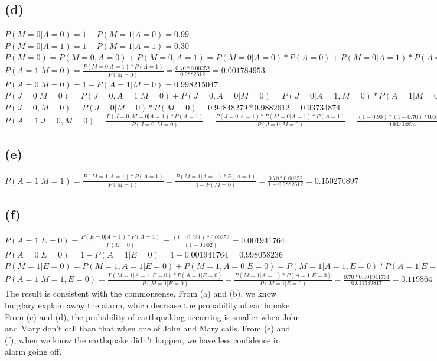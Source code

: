 \documentclass [11pt, a4paper, oneside] {article}
\begin{document}
\subsection *{(d)}
$P(M=0|A=0) = 1 - P(M=1|A=0) = 0.99$\\
$P(M=0|A=1) = 1 - P(M=1|A=1) = 0.30$\\
$P(M=0) = P(M=0, A=0) + P(M=0, A=1) = P(M=0|A=0)*P(A=0) + P(M=0|A=1)*P(A=1) = 0.99*0.99748 + 0.30*0.00252 = 0.9882612$\\
$P(A=1|M=0) = \frac{P(M=0|A=1)*P(A=1)}{P(M=0)} = \frac{0.70*0.00252}{0.9882612} = 0.001784953$\\
$P(A=0|M=0) = 1 - P(A=1|M=0) = 0.998215047$\\
$P(J=0|M=0) = P(J=0, A=1|M=0) + P(J=0, A=0|M=0) = P(J=0|A=1, M=0)*P(A=1|M=0) + P(J=0|A=0, M=0)*P(A=0|M=0) = P(J=0|A=1)*P(A=1|M=0) + P(J=0|A=0)*P(A=0|M=0)=
(1-0.90)*0.001784953 + (1-0.05)*0.998215047 = 0.94848279$\\
$P(J=0, M=0) = P(J=0|M=0) * P(M=0) = 0.94848279 * 0.9882612 = 0.93734874$\\
$P(A=1|J=0, M=0) = \frac{P(J=0, M=0|A=1)*P(A=1)}{P(J=0, M=0)} = \frac{P(J=0|A=1)*P(M=0|A=1)*P(A=1)}{P(J=0, M=0)} = \frac{(1-0.90)*(1-0.70)*0.00252}{0.93734874} = 0.000080653$\\
\subsection *{(e)}
$P(A=1|M=1) = \frac{P(M=1|A=1)*P(A=1)}{P(M=1)} = \frac{P(M=1|A=1)*P(A=1)}{1 - P(M=0)} = \frac{0.70*0.00252}{1-0.9882612} = 0.150270897$\\
\subsection *{(f)}
$P(A=1|E=0) = \frac{P(E=0|A=1)*P(A=1)}{P(E=0)} = \frac{(1-0.231)*0.00252}{(1-0.002)} = 0.001941764$\\
$P(A=0|E=0) = 1 - P(A=1|E=0) = 1 - 0.001941764 = 0.998058236$\\
$P(M=1|E=0) = P(M=1, A=1|E=0) + P(M=1, A=0|E=0) = P(M=1|A=1, E=0)*P(A=1|E=0) + P(M=1|A=0, E=0)*P(A=0|E=0) = P(M=1|A=1)*P(A=1|E=0) + P(M=1|A=0)*P(A=0|E=0) = 
0.70*0.001941764 + 0.01*0.998058236 = 0.011339817$\\
$P(A=1|M=1, E=0) = \frac{P(M=1|A=1, E=0)*P(A=1|E=0)}{P(M=1|E=0)} = \frac{P(M=1|A=1)*P(A=1|E=0)}{P(M=1|E=0)} = \frac{0.70*0.001941764}{0.011339817} = 0.119864$\\

The result is consistent with the commonsense. From (a) and (b), we know burglary explain away the alarm, which decrease the probability of earthquake. From (c) and (d),  the probability of earthquaking occurring is smaller when John and Mary don't call than that when one of John and Mary calls. From (e) and (f), when we know the earthquake didn't happen, we have less confidence in alarm going off. 
\end{document}
